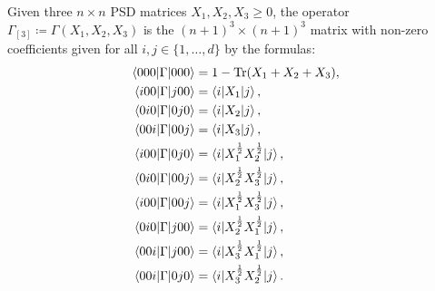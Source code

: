 \documentclass[notitlepage, 10pt]{article}
\begin{document}
\begin{exam}
    Given three $n\times n$ PSD matrices $X_1, X_2, X_3 \geq 0$, the operator $\Gamma_{[3]} \coloneqq \Gamma(X_1, X_2, X_3)$ is the $(n+1)^{3}\times (n+1)^{3}$ matrix with non-zero coefficients given for all $i,j \in \{1, \ldots, d\}$ by the formulas:
    \begin{align}
        \begin{split}
            \braket{000|\Gamma|000} &= 1-\operatorname{Tr}(X_1+X_2+X_3), \\
            \braket{i00|\Gamma|j00} &= \braket{i|X_1|j}, \\
            \braket{0i0|\Gamma|0j0} &= \braket{i|X_2|j}, \\
            \braket{00i|\Gamma|00j} &= \braket{i|X_3|j}, \\
            \braket{i00|\Gamma|0j0} &= \braket{i|X_1^{\frac{1}{2}}X_2^{\frac{1}{2}}|j}, \\
            \braket{0i0|\Gamma|00j} &= \braket{i|X_2^{\frac{1}{2}}X_3^{\frac{1}{2}}|j}, \\
            \braket{i00|\Gamma|00j} &= \braket{i|X_1^{\frac{1}{2}}X_3^{\frac{1}{2}}|j}, \\
            \braket{0i0|\Gamma|j00} &= \braket{i|X_2^{\frac{1}{2}}X_1^{\frac{1}{2}}|j}, \\
            \braket{00i|\Gamma|j00} &= \braket{i|X_3^{\frac{1}{2}}X_1^{\frac{1}{2}}|j}, \\
            \braket{00i|\Gamma|0j0} &= \braket{i|X_3^{\frac{1}{2}}X_2^{\frac{1}{2}}|j}.
        \end{split}
    \end{align}
\end{exam}
\end{document}
